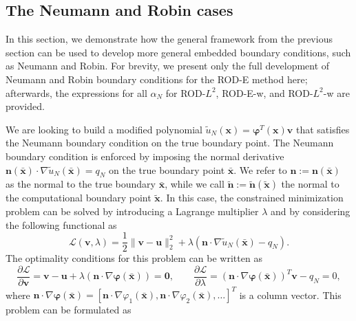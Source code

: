 \documentclass{article}
\renewcommand{\phi}{\varphi}
\begin{document}
\subsection{The Neumann and Robin cases}\label{sec:PolyCorrGen}

In this section, we demonstrate how the general framework from the previous section can be used to develop more general embedded boundary conditions, such as Neumann and Robin. For brevity, we present only the full development of Neumann and Robin boundary conditions for the ROD-E method here; afterwards, the expressions for all $\alpha_N$ for ROD-$L^2$, ROD-E-w, and ROD-$L^2$-w are provided.

We are looking to build a modified polynomial $\tilde u_N(\boldsymbol{x})=\boldsymbol{\phi}^T(\boldsymbol{x})\boldsymbol{v}$ that satisfies the Neumann boundary condition on the true boundary point. The Neumann boundary condition is enforced by imposing the normal derivative $\boldsymbol{n}(\bar{\boldsymbol{x}}) \cdot \nabla \tilde u_N(\bar{\boldsymbol{x}}) = q_N$ on the true boundary point $\bar{\boldsymbol{x}}$. 
We refer to $\boldsymbol{n}:=\boldsymbol{n}(\bar{\boldsymbol{x}})$ as the normal to the true boundary $\bar{\boldsymbol{x}}$, while we call $\tilde{\boldsymbol{n}}:=\tilde{\boldsymbol{n}}(\tilde{\boldsymbol{x}})$ the normal to the computational boundary point $\tilde{\boldsymbol{x}}$. 
In this case, the constrained minimization problem can be solved by introducing a Lagrange multiplier $\lambda$ and by considering the following functional as
\begin{equation}
    \mathcal{L}(\boldsymbol{v} , \lambda) = \frac12 \|\boldsymbol{v} - \boldsymbol{u}\|^2_2 + \lambda (\boldsymbol{n} \cdot \nabla \tilde u_N(\bar{\boldsymbol{x}}) - q_N ) .
\end{equation}
The optimality conditions for this problem can be written as
\begin{equation}
    \frac{\partial \mathcal{L}}{\partial \boldsymbol{v}} = \boldsymbol{v} - \boldsymbol{u} + \lambda  (\boldsymbol{n} \cdot \nabla \boldsymbol{\phi}(\bar{\boldsymbol{x}})) = \boldsymbol{0} , \qquad \frac{\partial \mathcal{L}}{\partial \lambda} = (\boldsymbol{n} \cdot \nabla \boldsymbol{\phi}(\bar{\boldsymbol{x}}))^T \boldsymbol{v} - q_N = 0 , 
\end{equation}
where $\boldsymbol{n}\cdot\nabla\boldsymbol{\phi}(\bar{\boldsymbol{x}}) = [\boldsymbol{n}\cdot\nabla\varphi_1(\bar{\boldsymbol{x}}),\boldsymbol{n}\cdot\nabla\varphi_2(\bar{\boldsymbol{x}}),\ldots]^T$ is a column vector. This problem can be formulated as
\end{document}
